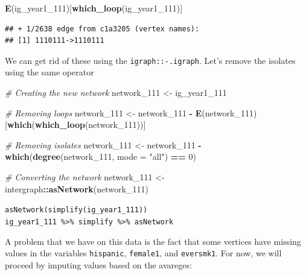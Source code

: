 \documentclass[]{book}
\newenvironment{Shaded}{\begin{snugshade}}{\end{snugshade}}
\newcommand{\CommentTok}[1]{\textcolor[rgb]{0.56,0.35,0.01}{\textit{#1}}}
\newcommand{\DataTypeTok}[1]{\textcolor[rgb]{0.13,0.29,0.53}{#1}}
\newcommand{\DecValTok}[1]{\textcolor[rgb]{0.00,0.00,0.81}{#1}}
\newcommand{\KeywordTok}[1]{\textcolor[rgb]{0.13,0.29,0.53}{\textbf{#1}}}
\newcommand{\NormalTok}[1]{#1}
\newcommand{\OperatorTok}[1]{\textcolor[rgb]{0.81,0.36,0.00}{\textbf{#1}}}
\newcommand{\StringTok}[1]{\textcolor[rgb]{0.31,0.60,0.02}{#1}}
\begin{document}
\begin{Shaded}
\begin{Highlighting}[]
\KeywordTok{E}\NormalTok{(ig_year1_}\DecValTok{111}\NormalTok{)[}\KeywordTok{which_loop}\NormalTok{(ig_year1_}\DecValTok{111}\NormalTok{)]}
\end{Highlighting}
\end{Shaded}

\begin{verbatim}
## + 1/2638 edge from c1a3205 (vertex names):
## [1] 1110111->1110111
\end{verbatim}

We can get rid of these using the \texttt{igraph::-.igraph}. Let's remove the isolates using the same operator

\begin{Shaded}
\begin{Highlighting}[]
\CommentTok{# Creating the new network}
\NormalTok{network_}\DecValTok{111}\NormalTok{ <-}\StringTok{ }\NormalTok{ig_year1_}\DecValTok{111}

\CommentTok{# Removing loops}
\NormalTok{network_}\DecValTok{111}\NormalTok{ <-}\StringTok{ }\NormalTok{network_}\DecValTok{111} \OperatorTok{-}\StringTok{ }\KeywordTok{E}\NormalTok{(network_}\DecValTok{111}\NormalTok{)[}\KeywordTok{which}\NormalTok{(}\KeywordTok{which_loop}\NormalTok{(network_}\DecValTok{111}\NormalTok{))]}

\CommentTok{# Removing isolates}
\NormalTok{network_}\DecValTok{111}\NormalTok{ <-}\StringTok{ }\NormalTok{network_}\DecValTok{111} \OperatorTok{-}\StringTok{ }\KeywordTok{which}\NormalTok{(}\KeywordTok{degree}\NormalTok{(network_}\DecValTok{111}\NormalTok{, }\DataTypeTok{mode =} \StringTok{"all"}\NormalTok{) }\OperatorTok{==}\StringTok{ }\DecValTok{0}\NormalTok{)}

\CommentTok{# Converting the network}
\NormalTok{network_}\DecValTok{111}\NormalTok{ <-}\StringTok{ }\NormalTok{intergraph}\OperatorTok{::}\KeywordTok{asNetwork}\NormalTok{(network_}\DecValTok{111}\NormalTok{)}
\end{Highlighting}
\end{Shaded}

\texttt{asNetwork(simplify(ig\_year1\_111))}
\texttt{ig\_year1\_111\ \%\textgreater{}\%\ simplify\ \%\textgreater{}\%\ asNetwork}

A problem that we have on this data is the fact that some vertices have
missing values in the variables \texttt{hispanic}, \texttt{female1}, and \texttt{eversmk1}. For now,
we will proceed by imputing values based on the avareges:
\end{document}
